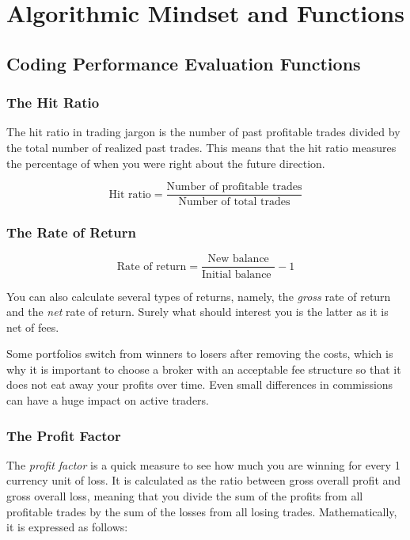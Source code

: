 \chapter{Algorithmic Mindset and Functions\label{ch02}}
\section{Coding Performance Evaluation Functions}
\subsection{The Hit Ratio}
The hit ratio in trading jargon is the number of past profitable trades divided by the total number of realized past trades. This means that the hit ratio measures the percentage of when you were right about the future direction.

\begin{equation}
    \text{Hit ratio} = \frac{\text{Number of profitable trades}}{\text{Number of total trades}}
\end{equation}

\subsection{The Rate of Return}
\begin{equation}
    \text{Rate of return}=\frac{\text{New balance}}{\text{Initial balance }}-1
\end{equation}

You can also calculate several types of returns, namely, the \textit{gross} rate of return and the \textit{net} rate of return. Surely what should interest you is the latter as it is net of fees.

\begin{tcolorbox}
    Some portfolios switch from winners to losers after removing the costs, which is why it is important to choose a broker with an acceptable fee structure so that it does not eat away your profits over time. Even small differences in commissions can have a huge impact on active traders.
\end{tcolorbox}

\subsection{The Profit Factor}
The \textit{profit factor} is a quick measure to see how much you are winning for every 1 currency unit of loss. It is calculated as the ratio between gross overall profit and gross overall loss, meaning that you divide the sum of the profits from all profitable trades by the sum of the losses from all losing trades. Mathematically, it is expressed as follows:

